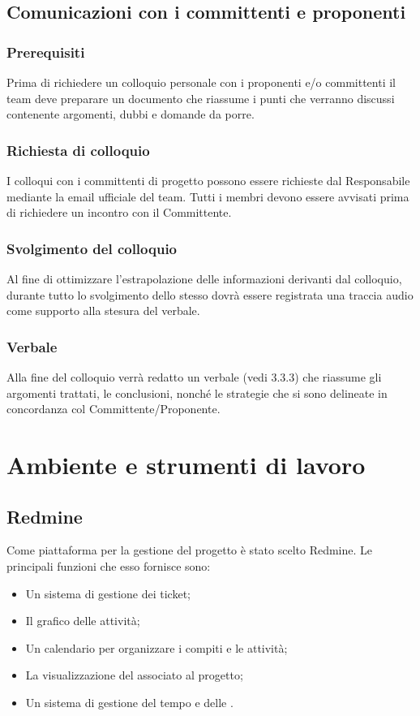 \subsection{Comunicazioni con i committenti e proponenti}
\label{3.4}

\subsubsection{Prerequisiti}
\label{3.4.1}
Prima di richiedere un colloquio personale con i proponenti e/o committenti il team deve preparare un documento che riassume i punti che verranno discussi contenente argomenti, dubbi e domande da porre.

\subsubsection{Richiesta di colloquio}
\label{3.4.2}
I colloqui con i committenti di progetto possono essere richieste dal Responsabile mediante la email ufficiale del team. Tutti i membri devono essere avvisati prima di richiedere un incontro con il Committente.

\subsubsection{Svolgimento del colloquio}
Al fine di ottimizzare l'estrapolazione delle informazioni derivanti dal colloquio, durante tutto lo svolgimento dello stesso dovrà essere registrata una traccia audio come supporto alla stesura del verbale. 

\subsubsection{Verbale}
\label{3.4.3}
Alla fine del colloquio verrà redatto un verbale (vedi 3.3.3) che riassume gli argomenti trattati, le conclusioni, nonché le strategie che si sono delineate in concordanza col Committente/Proponente.

\newpage
\section{Ambiente e strumenti di lavoro}
\label{4.0}

\subsection{Redmine}
\label{4.1}
Come piattaforma per la gestione del progetto è stato scelto Redmine. Le principali funzioni che esso fornisce sono:
\begin{itemize}
\item Un sistema di gestione dei ticket;
\item Il grafico  delle attività;
\item Un calendario per organizzare i compiti e le attività;
\item La visualizzazione del  associato al progetto;
\item Un sistema di  gestione del tempo e delle .
\end{itemize}

